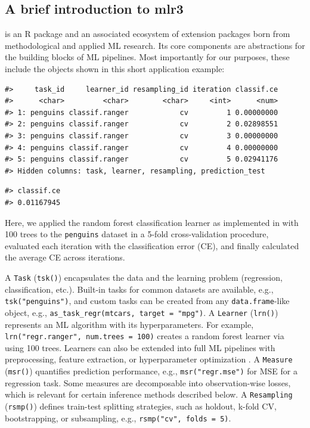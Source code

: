 \subsection{A brief introduction to mlr3}\label{a-brief-introduction-to-mlr3}

 is an R package and an associated ecosystem of extension packages born from methodological and applied ML research.
Its core components are abstractions for the building blocks of ML pipelines.
Most importantly for our purposes, these include the objects shown in this short application example:

\begin{verbatim}
#>     task_id     learner_id resampling_id iteration classif.ce
#>      <char>         <char>        <char>     <int>      <num>
#> 1: penguins classif.ranger            cv         1 0.00000000
#> 2: penguins classif.ranger            cv         2 0.02898551
#> 3: penguins classif.ranger            cv         3 0.00000000
#> 4: penguins classif.ranger            cv         4 0.00000000
#> 5: penguins classif.ranger            cv         5 0.02941176
#> Hidden columns: task, learner, resampling, prediction_test
\end{verbatim}

\begin{verbatim}
#> classif.ce 
#> 0.01167945
\end{verbatim}

Here, we applied the random forest classification learner as implemented in  with 100 trees to the \texttt{penguins} dataset \citep{horst2020palmerpenguinspalmer} in a 5-fold cross-validation procedure, evaluated each iteration with the classification error (CE), and finally calculated the average CE across iterations.

A \texttt{Task} (\texttt{tsk()}) encapsulates the data and the learning problem (regression, classification, etc.).
Built-in tasks for common datasets are available, e.g., \texttt{tsk("penguins")}, and custom tasks can be created from any \texttt{data.frame}-like object, e.g., \texttt{as\_task\_regr(mtcars,\ target\ =\ "mpg")}.
A \texttt{Learner} (\texttt{lrn()}) represents an ML algorithm with its hyperparameters.
For example, \texttt{lrn("regr.ranger",\ num.trees\ =\ 100)} creates a random forest learner via  using 100 trees.
Learners can also be extended into full ML pipelines with preprocessing, feature extraction, or hyperparameter optimization \citep[see][\citet{mlr3booktuning}, \citet{binder2021mlr3pipelinesflexible}]{mlr3bookpreprocessing}.
A \texttt{Measure} (\texttt{msr()}) quantifies prediction performance, e.g., \texttt{msr("regr.mse")} for MSE for a regression task.
Some measures are decomposable into observation-wise losses, which is relevant for certain inference methods described below.
A \texttt{Resampling} (\texttt{rsmp()}) defines train-test splitting strategies, such as holdout, k-fold CV, bootstrapping, or subsampling, e.g., \texttt{rsmp("cv",\ folds\ =\ 5)}.

